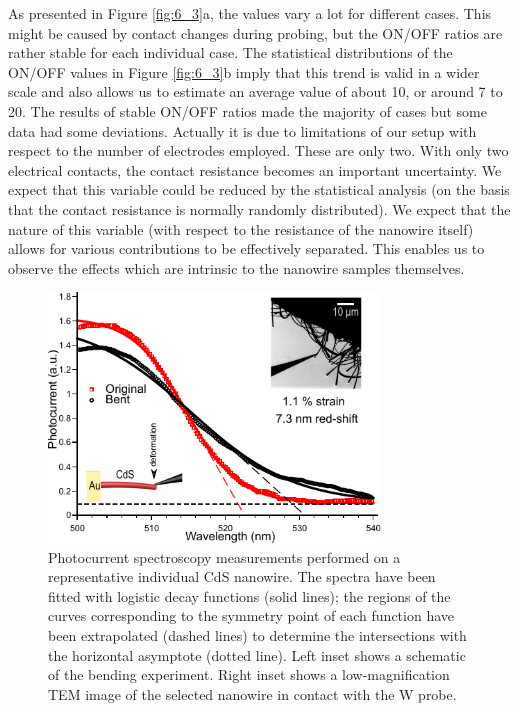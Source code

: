 As presented in Figure \ref{fig:6_3}a, the values vary a lot for different cases. This might be caused by contact changes during probing, but the ON/OFF ratios are rather stable for each individual case. 
The statistical distributions of the ON/OFF values in Figure \ref{fig:6_3}b imply that this trend is valid in a wider scale and also allows us to estimate an average value of about 10, or around 7 to 20. 
The results of stable ON/OFF ratios made the majority of cases but some data had some deviations. 
Actually it is due to limitations of our setup with respect to the number of electrodes employed. These are only two. 
With only two electrical contacts, the contact resistance becomes an important uncertainty.\cite{Hummelgard2011} 
We expect that this variable could be reduced by the statistical analysis (on the basis that the contact resistance is normally randomly distributed). 
We expect that the nature of this variable (with respect to the resistance of the nanowire itself) allows for various contributions to be effectively separated. This enables us to observe the effects which are intrinsic to the nanowire samples themselves.

\begin{figure}  
\centering
\includegraphics[width=250pt]{figures/figure6_4}
\caption[Photocurrent spectroscopy of deformed CdS NW]
{Photocurrent spectroscopy measurements performed on a representative individual CdS nanowire. The spectra have been fitted with logistic decay functions (solid lines); the regions of the curves corresponding to the symmetry point of each function have been extrapolated (dashed lines) to determine the intersections with the horizontal asymptote (dotted line). 
Left inset shows a schematic of the bending experiment. Right inset shows a low-magnification TEM image of the selected nanowire in contact with the W probe. 
\label{fig:6_4}}
\end{figure}

